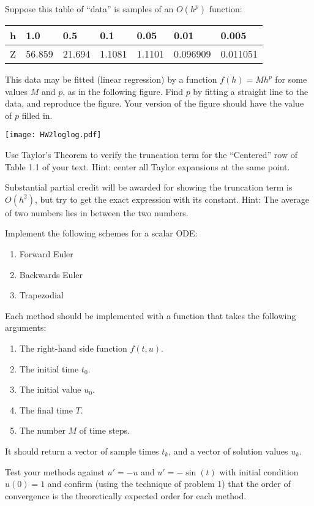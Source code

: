 \documentclass[minion]{homework}
\begin{document}
\begin{problems}

\problem Suppose this table of ``data'' is samples of an 
$O(h^p)$ function:

\hfil\begin{tabular}{c|l|l|l|l|l|l}
 h  & 1.0 & 0.5 & 0.1 & 0.05 & 0.01 & 0.005 \\\hline
Z & 56.859  & 21.694 & 1.1081 & 1.1101 & 0.096909 & 0.011051
\end{tabular}

This data may be fitted (linear regression) by a function 
$f(h) = M h^p$ for some values $M$ and $p$, as in the following figure.
Find $p$ by fitting a straight line to the data, and reproduce the figure. Your version of the figure should have the value of $p$ filled in.

\hfil\texttt{[image: HW2loglog.pdf]}

\problem Use Taylor's Theorem to verify the truncation term
for the ``Centered'' row of Table 1.1 of your text.  Hint:
center all Taylor expansions at the same point. 

Substantial partial
credit will be awarded for showing the truncation
term is $O(h^2)$, but try to get the exact expression with its
constant. Hint: The average of two numbers lies in between the two
numbers.

\problem Implement the following schemes for
a scalar ODE:
\begin{enumerate}
	\item Forward Euler
	\item Backwards Euler
	\item Trapezodial
\end{enumerate}
Each method should be implemented with a function
that takes the following arguments:
\begin{enumerate}
	\item The right-hand side function $f(t,u)$.
	\item The initial time $t_0$.
	\item The initial value $u_0$.
	\item The final time $T$.
	\item The number $M$ of time steps.
\end{enumerate}
It should return a vector of sample times $t_k$, 
and a vector of solution values $u_k$.

Test your methods against $u'=-u$ and $u'=-\sin(t)$
with initial condition $u(0)=1$ and confirm (using the technique
of problem 1) that 
the order of convergence is the theoretically expected order
for each method.


\end{problems}
\end{document}
